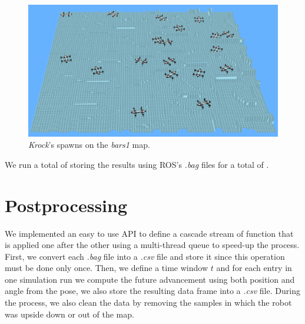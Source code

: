 \documentclass[../document.tex]{subfiles}
\begin{document}
\begin{figure} [htbp]
\centering
\includegraphics[width=\linewidth]{../img/krock-spawn-20-bars1.png}
\caption{\emph{Krock}'s spawns on the \emph{bars1} map.}
\end{figure}
We run a total of  storing the results using ROS's \emph{.bag} files for a total of .
\section{Postprocessing}

We implemented an easy to use API  to define a cascade stream of function that is applied one after the other using a multi-thread queue to speed-up the process.
First, we convert each \emph{.bag} file into a \emph{.csv} file and store it since this operation must be done only once. Then, we define a time window $t$ and for each entry in one simulation run we compute the future advancement using both position and angle from the pose, we also store the resulting data frame into a \emph{.csv} file. During the process, we also clean the data by removing the samples in which the robot was upside down or out of the map.
\end{document}

